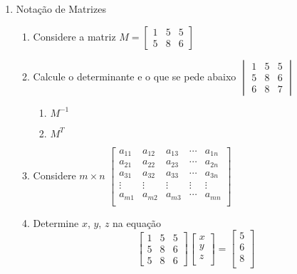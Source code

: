 \documentclass[a4paper, 12pt]{article}
\begin{document}
 
\begin{enumerate}
\item Notação de Matrizes
\begin{enumerate}
 \item Considere a matriz
 $M=\begin{bmatrix}
 1 & 5 & 5 \\
 5 & 8 & 6
 \end{bmatrix}
 $
 \item Calcule o determinante e  o que se pede abaixo
  $\begin{vmatrix}
 1 & 5 & 5 \\
 5 & 8 & 6 \\
 6 & 8 & 7
 \end{vmatrix}
 $
 \begin{enumerate}

 \item $M^{-1}$
 \item $M^{T}$
 \end{enumerate}
 
 \item Considere $m\times n$
 $\begin{bmatrix}
 a_{11} & a_{12} & a_{13} & \cdots & a_{1n}\\
 a_{21} & a_{22} & a_{23} & \cdots & a_{2n}\\
 a_{31} & a_{32} & a_{33} & \cdots & a_{3n}\\
 \vdots & \vdots & \vdots & \vdots & \vdots\\
 a_{m1} & a_{m2} & a_{m3} & \cdots & a_{mn}\\
 \end{bmatrix}$
 
 \item Determine $x$, $y$, $z$ na equação
 $$\begin{bmatrix}
 1 & 5 & 5 \\
 5 & 8 & 6 \\
 5 & 8 & 6
 \end{bmatrix}
 \begin{bmatrix}
  x \\
  y \\
  z \\
 \end{bmatrix}
 =
 \begin{bmatrix}
 5 \\
 6 \\
 8 \\
 \end{bmatrix}
 $$
\end{enumerate}


\end{enumerate}
\end{document}
